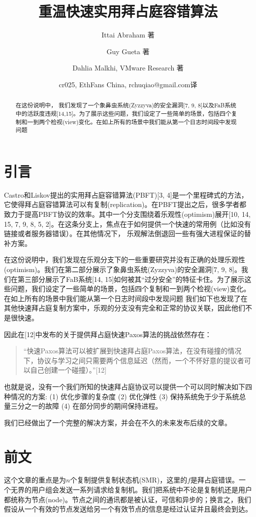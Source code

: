 \documentclass[UTF8]{ctexart}
\title{重温快速实用拜占庭容错算法}
\author{Ittai Abraham 著 \and Guy Gueta 著 \and Dahlia Malkhi, VMware Research 著 \and cr025, EthFans China, rchuqiao@gmail.com译}
\begin{document}
\maketitle

\begin{abstract}
在这份说明中， 我们发现了一个象鼻虫系统(Zyzzyva)的安全漏洞[7, 9, 8]以及FaB系统中的活跃度违规[14,15]。为了展示这些问题，我们设定了一些简单的场景，包括四个复制和一到两个检视(view)变化。在如上所有的场景中我们能从第一个日志时间段中发现问题
\end{abstract}

\section{引言}
Castro和Liskov提出的实用拜占庭容错算法(PBFT)[3, 4]是一个里程碑式的方法，它使得拜占庭容错算法可以有复制(replication)。在PBFT提出之后，很多学者都致力于提高PBFT协议的效率。其中一个分支围绕着乐观性(optimism)展开[10, 14, 15, 7, 9, 8, 5, 2]。在这条分支上，焦点在于如何提供一个快速的常用例（比如没有链接或者服务器错误）。在其他情况下， 乐观解法倒退回一些有强大进程保证的替补方案。

在这份说明中，我们发现在乐观分支下的一些重要研究并没有正确的处理乐观性(optimism)。我们在第二部分展示了象鼻虫系统(Zyzzyva)的安全漏洞[7, 9, 8]。我们在第三部分展示了FaB系统[14, 15]如何被其“过分安全”的特征卡住。为了展示这些问题，我们设定了一些简单的场景，包括四个复制和一到两个检视(view)变化。在如上所有的场景中我们能从第一个日志时间段中发现问题
我们如下也发现了在其他快速拜占庭复制方案中，乐观的分支没有完全和正常的协议关联，因此他们不是很快速。

因此在[12]中发布的关于提供拜占庭快速Paxos算法的挑战依然存在：
\begin{quotation}
“快速Paxos算法可以被扩展到快速拜占庭Paxos算法，在没有碰撞的情况下，协议与学习之间只需要两个信息延迟（然而，一个不怀好意的提议者可以自己创建一个碰撞）。”[12]
\end{quotation}

也就是说，没有一个我们所知的快速拜占庭协议可以提供一个可以同时解决如下四种情况的方案: (1) 优化步骤的复杂度 (2) 优化弹性 (3) 保持系统免于少于系统总量三分之一的故障 (4) 在部分同步的期间保持进程。

我们已经做出了一个完整的解决方案，并会在不久的未来发布后续的文章。


\section{前文} \label{sec:firstpage}
这个文章的重点是为$n$个复制提供复制状态机(SMR)，这里的$f$是拜占庭错误。一个无界的用户组会发送一系列请求给复制机。我们把系统中不论是复制机还是用户都统称为节点(node)。节点之间的通讯都是被认证，可信和异步的；换言之，我们假设从一个有效的节点发送给另一个有效节点的信息是经过认证并且最终会到达。
\end{document}
